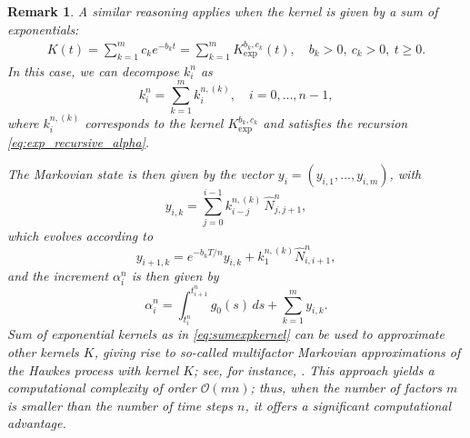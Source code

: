\documentclass{article}
\newcommand{\1}{\mathbbm{1}}
\newtheorem{remark}[theorem]{Remark}
\numberwithin{equation}{section}
\begin{document}
\begin{remark}
A similar reasoning applies when the kernel is given by a sum of exponentials:
\begin{align}\label{eq:sumexpkernel}
K(t) = \sum_{k=1}^m c_k e^{-b_k t} = \sum_{k=1}^m K_{\mathrm{exp}}^{b_k, c_k}(t), \quad b_k > 0, \ c_k > 0, \ t \geq 0.    
\end{align}
In this case, we can decompose $k_i^n$ as
\[
k_i^n = \sum_{k=1}^m k_i^{n,(k)}, \quad i = 0, \ldots, n-1,
\]
where $k_i^{n,(k)}$ corresponds to the kernel $K_{\mathrm{exp}}^{b_k, c_k}$ and satisfies the recursion \eqref{eq:exp_recursive_alpha}.  

The Markovian state is then given by the vector ${y_i} = (y_{i,1}, \ldots, y_{i,m})$, with
\[
y_{i,k} = \sum_{j=0}^{i-1} k_{i-j}^{n,(k)} \, \widehat N_{j,j+1}^n,
\]
which evolves according to
\[
y_{i+1,k} = e^{-b_k T / n} y_{i,k} + k_1^{n,(k)} \widehat N_{i,i+1}^n,
\]
and the increment $\alpha_i^n$ is then given by
\[
\alpha_i^n = \int_{t_i^n}^{t_{i+1}^n} g_0(s)\, ds + \sum_{k=1}^m y_{i,k}.
\]
Sum of exponential kernels as in \eqref{eq:sumexpkernel} can be used to approximate other kernels $K$, giving rise to so-called multifactor Markovian approximations of the Hawkes process with kernel $K$; see, for instance, \cite*[Section 7.2]{abietal2021weak}. This approach yields a  computational complexity of order $\mathcal{O}(mn)$; thus, when the number of factors $m$ is smaller than the number of time steps $n$, it offers a significant computational advantage.
\end{remark}


\end{document}
